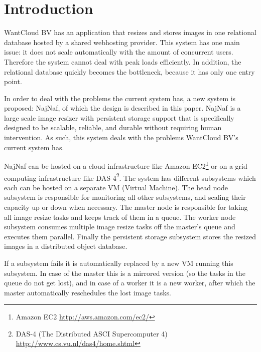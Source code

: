 \documentclass[10pt,journal,compsoc]{IEEEtran}
\begin{document}
\maketitle


\section{Introduction}
WantCloud BV has an application that resizes and stores images in one relational database
hosted by a shared webhosting provider. This system has one main issue: it does
not scale automatically with the amount of concurrent users. Therefore the
system cannot deal with peak loads efficiently. In addition, the relational
database quickly becomes the bottleneck, because it has only one entry point.

In order to deal with the problems the current system has, a new system is
proposed: NajNaf, of which the design is described in this paper.
NajNaf is a large scale image resizer with persistent storage support that is
specifically designed to be scalable, reliable, and durable without requiring
human intervention. As such, this system deals with the problems WantCloud
BV's current system has. 

NajNaf can be hosted on a cloud infrastructure like Amazon
EC2\footnote{ Amazon EC2 \url{http://aws.amazon.com/ec2/}} or on a grid
computing infrastructure like 
DAS-4\footnote{DAS-4 (The Distributed ASCI Supercomputer 4)
\url{http://www.cs.vu.nl/das4/home.shtml}}. The system has different subsystems
which each can be hosted on a separate VM (Virtual Machine). The head node
subsystem is responsible for monitoring all other
subsystems, and scaling their capacity up or down when necessary. The master
node is responsible for taking all image resize tasks and keeps track of them in a
queue. The worker node subsystem consumes multiple image resize tasks off the master's
queue and executes them parallel. Finally the persistent storage subsystem stores the resized images
in a distributed object database.

If a subsystem fails it is automatically replaced by a new VM running this
subsystem. In case of the master this is a mirrored version (so the tasks in the
queue do not get lost), and in case of a worker it is a new worker, after which
the master automatically reschedules the lost image tasks.
\end{document}
